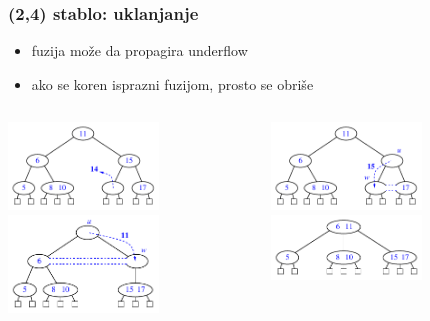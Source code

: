 \documentclass[compress,aspectratio=169]{beamer}
\begin{document}
\begin{frame}[fragile]
  \frametitle{(2,4) stablo: uklanjanje}
  \begin{itemize}
    \item fuzija može da propagira underflow
    \item ako se koren isprazni fuzijom, prosto se obriše
  \end{itemize}
  \begin{columns}
    \begin{column}[t]{6cm}
      \begin{center}
        \includegraphics[width=4cm]{asp-11-pic37a.pdf} \\
        \includegraphics[width=4cm]{asp-11-pic37c.pdf}
      \end{center}
    \end{column}
    \begin{column}[t]{6cm}
      \begin{center}
        \includegraphics[width=4cm]{asp-11-pic37b.pdf} \\
        \includegraphics[width=4cm]{asp-11-pic37d.pdf}
      \end{center}
    \end{column}
  \end{columns}
\end{frame}
\end{document}
